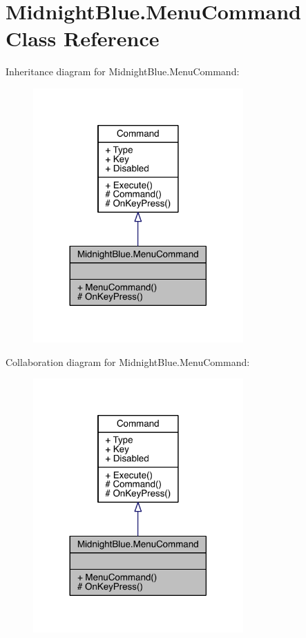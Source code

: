 \hypertarget{class_midnight_blue_1_1_menu_command}{}\section{Midnight\+Blue.\+Menu\+Command Class Reference}
\label{class_midnight_blue_1_1_menu_command}


Inheritance diagram for Midnight\+Blue.\+Menu\+Command\+:\nopagebreak
\begin{figure}[H]
\begin{center}
\leavevmode
\includegraphics[width=228pt]{class_midnight_blue_1_1_menu_command__inherit__graph}
\end{center}
\end{figure}


Collaboration diagram for Midnight\+Blue.\+Menu\+Command\+:\nopagebreak
\begin{figure}[H]
\begin{center}
\leavevmode
\includegraphics[width=228pt]{class_midnight_blue_1_1_menu_command__coll__graph}
\end{center}
\end{figure}
